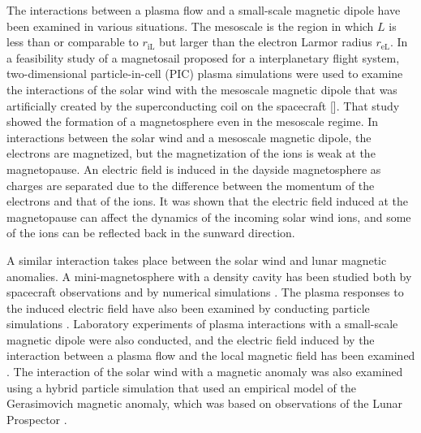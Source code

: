 \documentclass[draft,jgrga]{agutex2015}
\begin{document}
\begin{article}
The interactions between a plasma flow and a small-scale magnetic dipole 
have been examined in various situations.
The mesoscale is the region in which $L$ is less than or comparable to $r_\mathrm{iL}$
but larger than the electron Larmor radius $r_\mathrm{eL}$.
In a feasibility study of a magnetosail \citep[e.g.,][]{Winglee2000} proposed for a interplanetary flight system, two-dimensional
particle-in-cell (PIC) plasma simulations were used to examine
the interactions of the solar wind with the mesoscale magnetic dipole that was artificially created by the
superconducting coil on the spacecraft [\cite{Moritaka2012}].
That study showed the formation of a magnetosphere even in the mesoscale regime.
In interactions between the solar wind and a mesoscale magnetic dipole, 
the electrons are magnetized, but the magnetization of the ions is weak at the magnetopause.
An electric field is induced in the dayside magnetosphere as charges are separated
due to the difference between the momentum of the electrons and that of the ions.
It was shown that the electric field induced at the magnetopause
can affect the dynamics of the incoming solar wind ions, and some of the ions can be reflected
back in the sunward direction.

A similar interaction takes place between the solar wind and lunar magnetic anomalies.
A mini-magnetosphere with a density cavity has been studied both by
 spacecraft observations and by numerical simulations
\citep[e.g.,][]{Harnett2000,Harnett2003,Halekas2008b,Bamford2012}.
The plasma responses to the induced electric field have also been examined
by conducting particle simulations
\citep[e.g.,][]{Harnett2002,Kallio2012,Poppe2012a,Deca2014,Deca2015}.
Laboratory experiments of plasma interactions
with a small-scale magnetic dipole
were also conducted, and the electric field 
induced by the interaction
between a plasma flow and the local magnetic field has been examined
\citep[e.g.,][]{Howes2015,Jarvinen2014,Wang2013,Bamford2012}.
The interaction of the solar wind with a magnetic anomaly was also 
examined using a hybrid particle simulation that used  
an empirical model of the Gerasimovich magnetic anomaly, which was based 
on observations of the Lunar Prospector 
\citep{Fatemi2015}.


\end{article}
\end{document}
